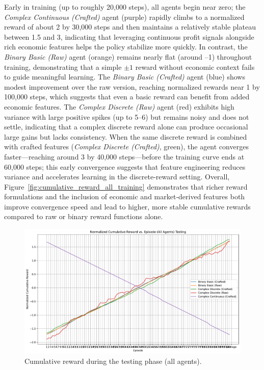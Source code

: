 \documentclass[sigconf]{acmart}
\begin{document}
Early in training (up to roughly 20,000 steps), all agents begin near zero; the \emph{Complex Continuous (Crafted)} agent (purple) rapidly climbs to a normalized reward of about 2 by 30,000 steps and then maintains a relatively stable plateau between 1.5 and 3, indicating that leveraging continuous profit signals alongside rich economic features helps the policy stabilize more quickly. In contrast, the \emph{Binary Basic (Raw)} agent (orange) remains nearly flat (around –1) throughout training, demonstrating that a simple $\pm1$ reward without economic context fails to guide meaningful learning. The \emph{Binary Basic (Crafted)} agent (blue) shows modest improvement over the raw version, reaching normalized rewards near 1 by 100,000 steps, which suggests that even a basic reward can benefit from added economic features. The \emph{Complex Discrete (Raw)} agent (red) exhibits high variance with large positive spikes (up to 5–6) but remains noisy and does not settle, indicating that a complex discrete reward alone can produce occasional large gains but lacks consistency. When the same discrete reward is combined with crafted features (\emph{Complex Discrete (Crafted)}, green), the agent converges faster—reaching around 3 by 40,000 steps—before the training curve ends at 60,000 steps; this early convergence suggests that feature engineering reduces variance and accelerates learning in the discrete‐reward setting. Overall, Figure~\ref{fig:cumulative_reward_all_training} demonstrates that richer reward formulations and the inclusion of economic and market‐derived features both improve convergence speed and lead to higher, more stable cumulative rewards compared to raw or binary reward functions alone.

\bigskip

\begin{figure}[t]
  \centering
  \includegraphics[width=\textwidth]{cumulative_reward_all_testing.pdf}
  \caption{Cumulative reward during the testing phase (all agents).}
  \label{fig:cumulative_reward_all_testing}
\end{figure}
\end{document}
